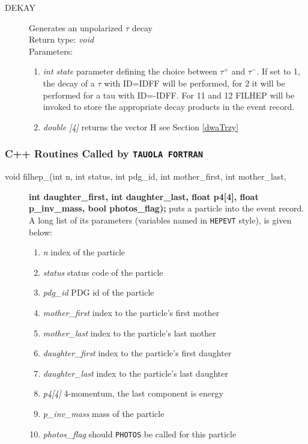 \documentclass[]{Tauola_interface_design}
\begin{document}
\begin{description}
\item[DEKAY] Generates an unpolarized $\tau$ decay  \\
  Return type: \textit{void} \\
  Parameters:
  \begin{enumerate}
    \item \textit {int state} parameter defining the choice between $\tau^+$ and $\tau^-$.
If set to 1, the decay of a $\tau$
with ID=IDFF will be performed, for 2 it will be performed for a tau with ID=-IDFF. For 11 and 12  FILHEP will be invoked to store 
the appropriate decay products in the event record.
                  
    \item \textit {double [4]} returns the vector H see Section \ref{dwaTrzy} 
  \end{enumerate}
\end{description}

\subsubsection{ C++ Routines Called by {\tt TAUOLA FORTRAN}   }
\begin{description}
\item[void filhep\_(int n, int status, int pdg\_id, int mother\_first, int mother\_last,]{\bf int daughter\_first, int daughter\_last, float p4{[}4{]}, float p\_inv\_mass, bool photos\_flag);} puts a particle into the event record. A long list of 
its parameters (variables named in {\tt HEPEVT} style), is given  below:

  \begin{enumerate}
    \item \textit {n} index of the particle
    \item \textit {status} status code of the particle
    \item \textit {pdg\_id} PDG id of the particle
    \item \textit {mother\_first} index to the particle's first mother
    \item \textit {mother\_last} index to the particle's last mother
    \item \textit {daughter\_first} index to the particle's first daughter
    \item \textit {daughter\_last} index to the particle's last daughter
    \item \textit {p4[4]} 4-momentum, the last component is energy 
    \item \textit {p\_inv\_mass} mass of the particle
    \item \textit {photos\_flag} should {\tt PHOTOS} be called for this particle
  \end{enumerate}
\end{description}
\end{document}
